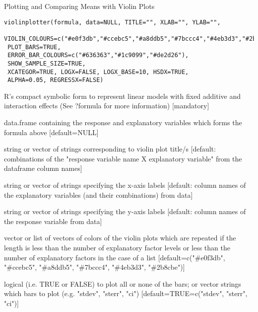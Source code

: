 \documentclass[letterpaper]{book}
\begin{document}
%
\begin{Description}\relax
Plotting and Comparing Means with Violin Plots
\end{Description}
%
\begin{Usage}
\begin{verbatim}
violinplotter(formula, data=NULL, TITLE="", XLAB="", YLAB="",
 VIOLIN_COLOURS=c("#e0f3db","#ccebc5","#a8ddb5","#7bccc4","#4eb3d3","#2b8cbe"),
 PLOT_BARS=TRUE,
 ERROR_BAR_COLOURS=c("#636363","#1c9099","#de2d26"),
 SHOW_SAMPLE_SIZE=TRUE,
 XCATEGOR=TRUE, LOGX=FALSE, LOGX_BASE=10, HSDX=TRUE,
 ALPHA=0.05, REGRESSX=FALSE)
\end{verbatim}
\end{Usage}
%
\begin{Arguments}
\begin{ldescription}
\item[\code{formula}] R's compact symbolic form to represent linear models with fixed additive and interaction effects (See ?formula for more information) [mandatory]

\item[\code{data}] data.frame containing the response and explanatory variables which forms the formula above [default=NULL]

\item[\code{TITLE}] string or vector of strings corresponding to violin plot title/s [default: combinations of the "response variable name X explanatory variable" from the dataframe column names]

\item[\code{XLAB}] string or vector of strings specifying the x-axis labels [default: column names of the explanatory variables (and their combinations) from data]

\item[\code{YLAB}] string or vector of strings specifying the y-axis labels [default: column names of the response variable from data]

\item[\code{VIOLIN\_COLOURS}] vector or list of vectors of colors of the violin plots which are repeated if the length is less than the number of explanatory factor levels or less than the number of explanatory factors in the case of a list [default=c("\#e0f3db", "\#ccebc5", "\#a8ddb5", "\#7bccc4", "\#4eb3d3", "\#2b8cbe")]

\item[\code{PLOT\_BARS}] logical (i.e. TRUE or FALSE) to plot all or none of the bars; or vector strings which bars to plot (e.g. "stdev", "sterr", "ci") [default=TRUE=c("stdev", "sterr", "ci")]


\end{ldescription}
\end{Arguments}
\end{document}
